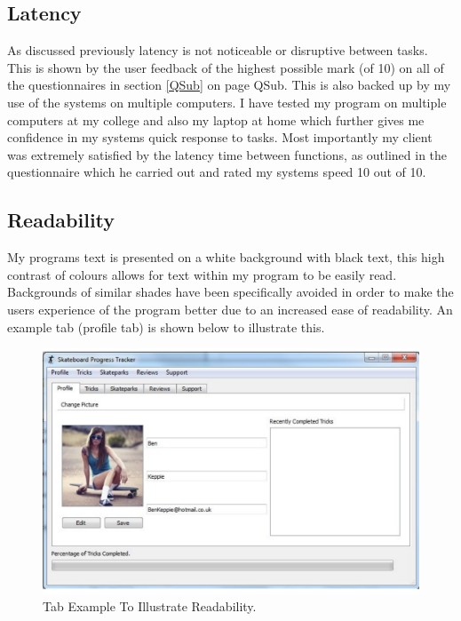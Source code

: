 	\subsection{Latency}

As discussed previously latency is not noticeable or disruptive between tasks. This is shown by the user feedback of the highest possible mark (of 10) on all of the questionnaires in section \ref{QSub} on page {QSub}. This is also backed up by my use of the systems on multiple computers. I have tested my program on multiple computers at my college and also my laptop at home which further gives me confidence in my systems quick response to tasks. Most importantly my client was extremely satisfied by the latency time between functions, as outlined in the questionnaire which he carried out and rated my systems speed 10 out of 10.

	\subsection{Readability}

My programs text is presented on a white background with black text, this high contrast of colours allows for text within my program to be easily read. Backgrounds of similar shades have been specifically avoided in order to make the users experience of the program better due to an increased ease of readability. An example tab (profile tab) is shown below to illustrate this. 

\begin{figure}[H]
    \includegraphics[width=\textwidth]{./Evaluation/images/Text.pdf}
    \caption{Tab Example To Illustrate Readability.} \label{fig:Text}
\end{figure}


